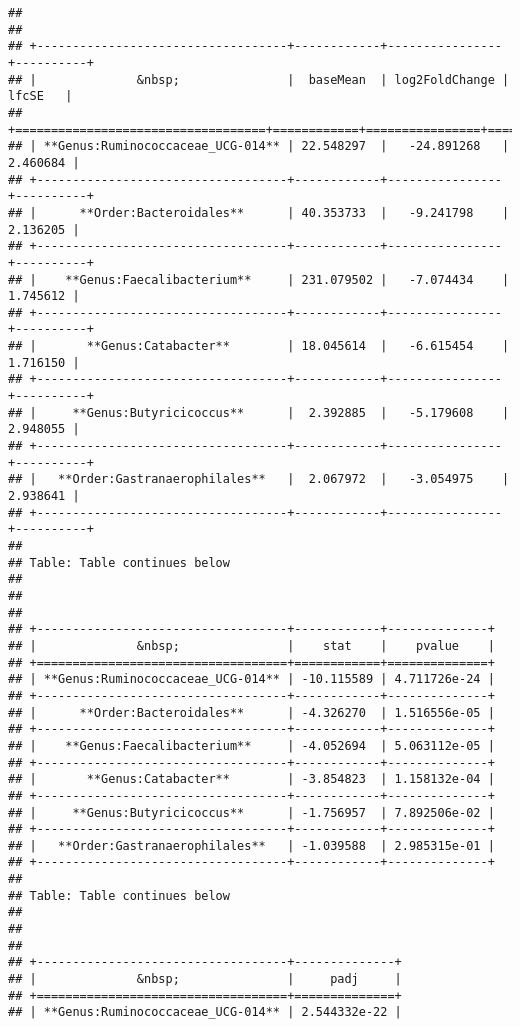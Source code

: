 \documentclass[
  oneside]{book}
\begin{document}
\begin{verbatim}
## 
## 
## +-----------------------------------+------------+----------------+----------+
## |              &nbsp;               |  baseMean  | log2FoldChange |  lfcSE   |
## +===================================+============+================+==========+
## | **Genus:Ruminococcaceae_UCG-014** | 22.548297  |   -24.891268   | 2.460684 |
## +-----------------------------------+------------+----------------+----------+
## |      **Order:Bacteroidales**      | 40.353733  |   -9.241798    | 2.136205 |
## +-----------------------------------+------------+----------------+----------+
## |    **Genus:Faecalibacterium**     | 231.079502 |   -7.074434    | 1.745612 |
## +-----------------------------------+------------+----------------+----------+
## |       **Genus:Catabacter**        | 18.045614  |   -6.615454    | 1.716150 |
## +-----------------------------------+------------+----------------+----------+
## |     **Genus:Butyricicoccus**      |  2.392885  |   -5.179608    | 2.948055 |
## +-----------------------------------+------------+----------------+----------+
## |   **Order:Gastranaerophilales**   |  2.067972  |   -3.054975    | 2.938641 |
## +-----------------------------------+------------+----------------+----------+
## 
## Table: Table continues below
## 
##  
## 
## +-----------------------------------+------------+--------------+
## |              &nbsp;               |    stat    |    pvalue    |
## +===================================+============+==============+
## | **Genus:Ruminococcaceae_UCG-014** | -10.115589 | 4.711726e-24 |
## +-----------------------------------+------------+--------------+
## |      **Order:Bacteroidales**      | -4.326270  | 1.516556e-05 |
## +-----------------------------------+------------+--------------+
## |    **Genus:Faecalibacterium**     | -4.052694  | 5.063112e-05 |
## +-----------------------------------+------------+--------------+
## |       **Genus:Catabacter**        | -3.854823  | 1.158132e-04 |
## +-----------------------------------+------------+--------------+
## |     **Genus:Butyricicoccus**      | -1.756957  | 7.892506e-02 |
## +-----------------------------------+------------+--------------+
## |   **Order:Gastranaerophilales**   | -1.039588  | 2.985315e-01 |
## +-----------------------------------+------------+--------------+
## 
## Table: Table continues below
## 
##  
## 
## +-----------------------------------+--------------+
## |              &nbsp;               |     padj     |
## +===================================+==============+
## | **Genus:Ruminococcaceae_UCG-014** | 2.544332e-22 |

\end{verbatim}
\end{document}

